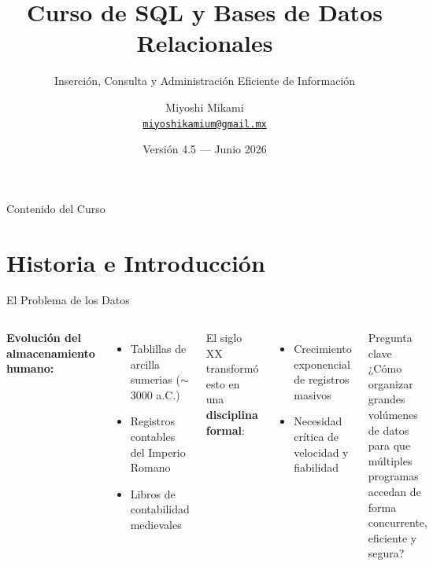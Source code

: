\documentclass[12pt, aspectratio=169, UTF8]{beamer}
\title[Curso de SQL]{Curso de SQL y Bases de Datos Relacionales}
\subtitle{Inserción, Consulta y Administración Eficiente de Información}
\author[Miyoshi Mikami]{Miyoshi Mikami \\ \small \href{mailto:miyoshikamium@gmail.mx}{\texttt{miyoshikamium@gmail.mx}}}
\institute[CNBV]{Comisión Nacional Bancaria y de Valores}
\date[Junio 2026]{Versión 4.5 — Junio 2026}
\begin{document}

{
\begin{frame}[plain]
  \titlepage
\end{frame}
}

\begin{frame}{Contenido del Curso}
  \tableofcontents[hideallsubsections]
\end{frame}

\section{Historia e Introducción}

\begin{frame}{El Problema de los Datos}
  \begin{columns}[T]
      \textbf{Evolución del almacenamiento humano:}
      \begin{itemize}
        \item Tablillas de arcilla sumerias ($\sim$3000 a.C.)
        \item Registros contables del Imperio Romano
        \item Libros de contabilidad medievales
      \end{itemize}
      \vspace{6pt}
      El siglo XX transformó esto en una \textbf{disciplina formal}:
      \begin{itemize}
        \item Crecimiento exponencial de registros masivos
        \item Necesidad crítica de velocidad y fiabilidad
      \end{itemize}
      \begin{block}{Pregunta clave}
        ¿Cómo organizar grandes volúmenes de datos para que múltiples programas accedan de forma concurrente, eficiente y segura?
      \end{block}
  \end{columns}
\end{frame}
\end{document}
